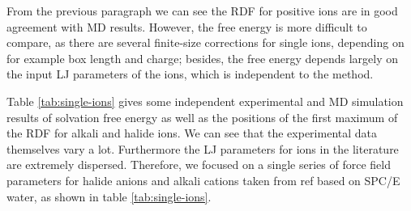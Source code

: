 From the previous paragraph we can see the \acs{RDF} for positive ions are in good
agreement with \acs{MD} results. However, the free energy is more
difficult to compare, as there are several finite-size corrections
for single ions, depending on for example box length and charge; besides,
the free energy depends largely on the input LJ parameters of the
ions, which is independent to the method.

Table \ref{tab:single-ions} gives some independent experimental
and \acs{MD} simulation results of solvation free energy as well
as the positions of the first maximum of the \acs{RDF} for alkali
and halide ions. We can see that the experimental data themselves
vary a lot. Furthermore the LJ parameters for ions in the literature
are extremely dispersed. Therefore, we focused on a single series
of force field parameters for halide anions and alkali cations taken
from ref \citep{horinek_rational_2009} based on SPC/E water, as shown
in table \ref{tab:single-ions}. 

